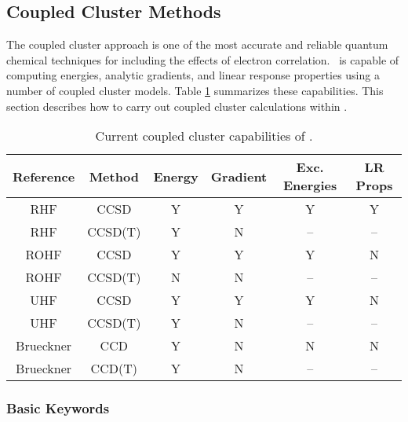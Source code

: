 \subsection{Coupled Cluster Methods} \label{cc}

The coupled cluster approach is one of the most accurate and reliable quantum
chemical techniques for including the effects of electron correlation.
\PSIthree\ is capable of computing energies, analytic gradients, and
linear response properties using a number of coupled cluster models.
Table \ref{table:ccsummary} summarizes these capabilities.  This section
describes how to carry out coupled cluster calculations within \PSIthree.
\begin{table}[h]
\begin{center}
\begin{tabular}{cccccc}
\hline
\hline
Reference & Method & Energy    & Gradient  &  Exc. Energies & LR Props \\
\hline
RHF       & CCSD    & Y & Y & Y & Y  \\
RHF       & CCSD(T) & Y & N & --& -- \\
ROHF      & CCSD    & Y & Y & Y & N  \\
ROHF      & CCSD(T) & N & N & --& -- \\
UHF       & CCSD    & Y & Y & Y & N  \\
UHF       & CCSD(T) & Y & N & --& -- \\
Brueckner & CCD     & Y & N & N & N  \\
Brueckner & CCD(T)  & Y & N & --& -- \\
\hline
\hline
\end{tabular}
\end{center}
\caption{Current coupled cluster capabilities of \PSIthree.}
\label{table:ccsummary}
\end{table}

\subsubsection{Basic Keywords}

